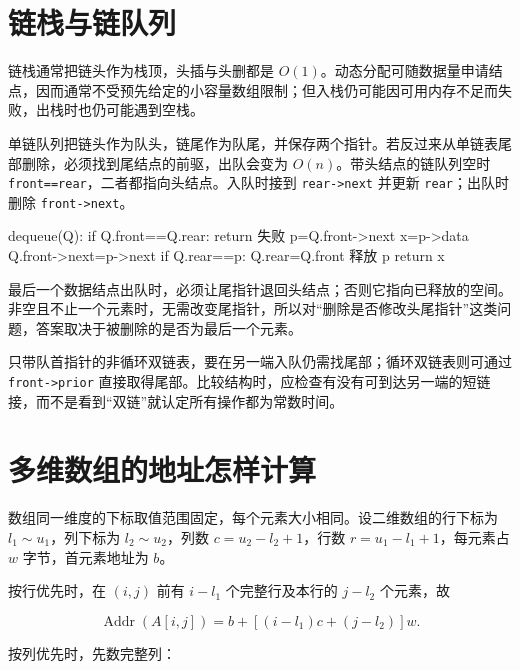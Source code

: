 \section{链栈与链队列}\label{DS03-04}

链栈通常把链头作为栈顶，头插与头删都是 \(O(1)\)。动态分配可随数据量申请结点，因而通常不受预先给定的小容量数组限制；但入栈仍可能因可用内存不足而失败，出栈时也仍可能遇到空栈。

单链队列把链头作为队头，链尾作为队尾，并保存两个指针。若反过来从单链表尾部删除，必须找到尾结点的前驱，出队会变为 \(O(n)\)。带头结点的链队列空时 \texttt{front=\allowbreak{}=\allowbreak{}rear}，二者都指向头结点。入队时接到 \texttt{rear->\allowbreak{}next} 并更新 \texttt{rear}；出队时删除 \texttt{front->\allowbreak{}next}。

\par\medskip\noindent\begin{minipage}{\linewidth}
\begin{codeblock}[language={}]
dequeue(Q):
    if Q.front==Q.rear: return 失败
    p=Q.front->next
    x=p->data
    Q.front->next=p->next
    if Q.rear==p: Q.rear=Q.front
    释放 p
    return x
\end{codeblock}
\end{minipage}\par\medskip

最后一个数据结点出队时，必须让尾指针退回头结点；否则它指向已释放的空间。非空且不止一个元素时，无需改变尾指针，所以对``删除是否修改头尾指针''这类问题，答案取决于被删除的是否为最后一个元素。

只带队首指针的非循环双链表，要在另一端入队仍需找尾部；循环双链表则可通过 \texttt{front->\allowbreak{}prior} 直接取得尾部。比较结构时，应检查有没有可到达另一端的短链接，而不是看到``双链''就认定所有操作都为常数时间。

\section{多维数组的地址怎样计算}\label{DS03-05}

数组同一维度的下标取值范围固定，每个元素大小相同。设二维数组的行下标为 \(l_1\sim u_1\)，列下标为 \(l_2\sim u_2\)，列数 \(c=u_2-l_2+1\)，行数 \(r=u_1-l_1+1\)，每元素占 \(w\) 字节，首元素地址为 \(b\)。

按行优先时，在 \((i,j)\) 前有 \(i-l_1\) 个完整行及本行的 \(j-l_2\) 个元素，故

\[\operatorname{Addr}(A[i,j])=b+[(i-l_1)c+(j-l_2)]w.\]

按列优先时，先数完整列：

